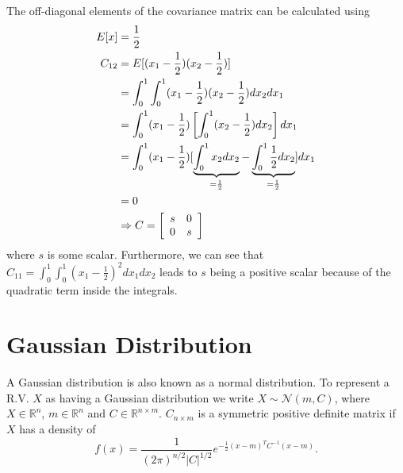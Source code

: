\documentclass[lecture,12pt,]{pcms-l}
\theoremstyle{example}
\begin{document}
The off-diagonal elements of the covariance matrix can be calculated using
\begin{align*}
E[x] &= \frac{1}{2} \\
C_{12} &= E[(x_1 - \frac{1}{2})(x_2 - \frac{1}{2})] \\
&= \int_0^1 \int_0^1 (x_1 - \frac{1}{2})(x_2 - \frac{1}{2})dx_2dx_1 \\
&= \int_0^1 (x_1 - \frac{1}{2})\left[\int_0^1 (x_2 - \frac{1}{2})dx_2\right]dx_1 \\
&= \int_0^1 (x_1 - \frac{1}{2})[\underbrace{\int_0^1 x_2dx_2}_{= \frac{1}{2}} - \underbrace{\int_0^1 \frac{1}{2}dx_2}_{= \frac{1}{2}}]dx_1 \\
&= 0 \\
&\Rightarrow C = \left[\begin{array}{c c}
                         s & 0 \\ 0 & s
                       \end{array}\right]
\end{align*}
where $s$ is some scalar. Furthermore, we can see that \\
$C_{11} = \int_0^1\int_0^1(x_1-\frac{1}{2})^2dx_1dx_2$ leads to $s$ being a positive scalar because of the quadratic term inside the integrals.

\section{Gaussian Distribution}
A Gaussian distribution is also known as a normal distribution. To represent a R.V. $X$ as having a Gaussian distribution we write $X \sim \mathcal{N}(m,C)$, where $X \in \mathbb{R}^n$, $m \in \mathbb{R}^n$ and $C \in \mathbb{R}^{n \times m}$. $C_{n \times m}$ is a symmetric positive definite matrix if $X$ has a density of
$$f(x) = \frac{1}{(2\pi)^{n/2}|C|^{1/2}}e^{-\frac{1}{2}(x-m)^TC^{-1}(x-m)}.$$
\end{document}
